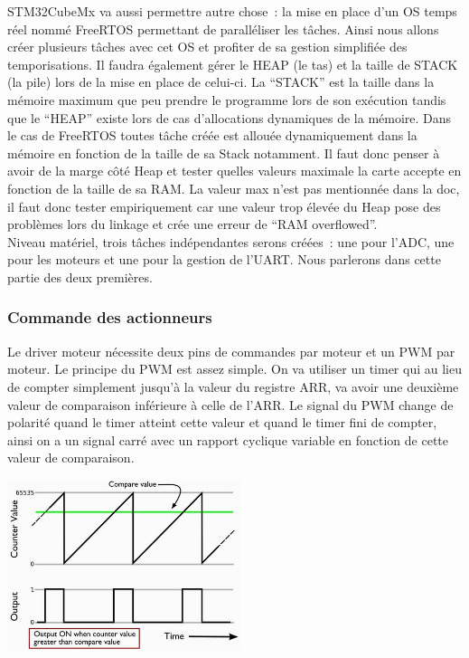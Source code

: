\documentclass{article}
\begin{document}
STM32CubeMx va aussi permettre autre chose~: la mise en place d'un OS temps réel nommé FreeRTOS permettant de paralléliser les tâches. Ainsi nous allons créer plusieurs tâches avec cet OS et profiter de sa gestion simplifiée des temporisations. Il faudra également gérer le HEAP (le tas) et la taille de STACK (la pile) lors de la mise en place de celui-ci. La ``STACK'' est la taille dans la mémoire maximum que peu prendre le programme lors de son exécution tandis que le ``HEAP'' existe lors de cas d'allocations dynamiques de la mémoire. Dans le cas de FreeRTOS toutes tâche créée est allouée dynamiquement dans la mémoire en fonction de la taille de sa Stack notamment. Il faut donc penser à avoir de la marge côté Heap et tester quelles valeurs maximale la carte accepte en fonction de la taille de sa RAM. La valeur max n'est pas mentionnée dans la doc, il faut donc tester empiriquement car une valeur trop élevée du Heap pose des problèmes lors du linkage et crée une erreur de ``RAM overflowed''. \\

Niveau matériel, trois tâches indépendantes serons créées~: une pour l'ADC, une pour les moteurs et une pour la gestion de l'UART. Nous parlerons dans cette partie des deux premières.

\subsubsection{Commande des actionneurs}

Le driver moteur nécessite deux pins de commandes par moteur et un PWM par moteur. Le principe du PWM est assez simple. On va utiliser un timer qui au lieu de compter simplement jusqu'à la valeur du registre ARR, va avoir une deuxième valeur de comparaison inférieure à celle de l'ARR. Le signal du PWM change de polarité quand le timer atteint cette valeur et quand le timer fini de compter, ainsi on a un signal carré avec un rapport cyclique variable en fonction de cette valeur de comparaison. \\

\begin{center}
  \includegraphics[height=5cm]{pwm.png}
\end{center}
\end{document}
